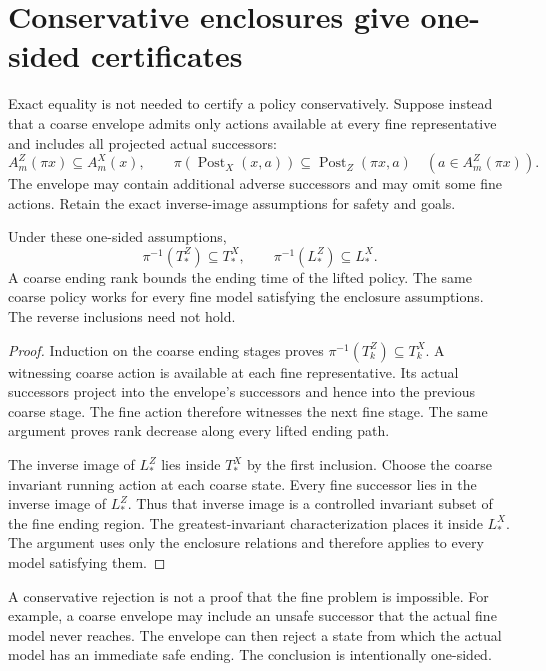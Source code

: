 \section{Conservative enclosures give one-sided certificates}
Exact equality is not needed to certify a policy conservatively. Suppose instead that a coarse envelope admits only actions available at every fine representative and includes all projected actual successors:
\[
 A^Z_m(\pi x)\subseteq A^X_m(x),\qquad
 \pi(\operatorname{Post}_X(x,a))
 \subseteq\operatorname{Post}_Z(\pi x,a)
 \quad(a\in A^Z_m(\pi x)).
\]
The envelope may contain additional adverse successors and may omit some fine actions. Retain the exact inverse-image assumptions for safety and goals.

\begin{Coreproposition}\label{Core:r:control-envelope}
Under these one-sided assumptions,
\[
 \pi^{-1}(T^Z_*)\subseteq T^X_*,\qquad
 \pi^{-1}(L^Z_*)\subseteq L^X_*.
\]
A coarse ending rank bounds the ending time of the lifted policy. The same coarse policy works for every fine model satisfying the enclosure assumptions. The reverse inclusions need not hold.
\end{Coreproposition}
\begin{proof}
Induction on the coarse ending stages proves
$\pi^{-1}(T^Z_k)\subseteq T^X_k$. A witnessing coarse action is available at each fine representative. Its actual successors project into the envelope's successors and hence into the previous coarse stage. The fine action therefore witnesses the next fine stage. The same argument proves rank decrease along every lifted ending path.

The inverse image of $L^Z_*$ lies inside $T^X_*$ by the first inclusion. Choose the coarse invariant running action at each coarse state. Every fine successor lies in the inverse image of $L^Z_*$. Thus that inverse image is a controlled invariant subset of the fine ending region. The greatest-invariant characterization places it inside $L^X_*$. The argument uses only the enclosure relations and therefore applies to every model satisfying them.
\end{proof}

A conservative rejection is not a proof that the fine problem is impossible. For example, a coarse envelope may include an unsafe successor that the actual fine model never reaches. The envelope can then reject a state from which the actual model has an immediate safe ending. The conclusion is intentionally one-sided.

